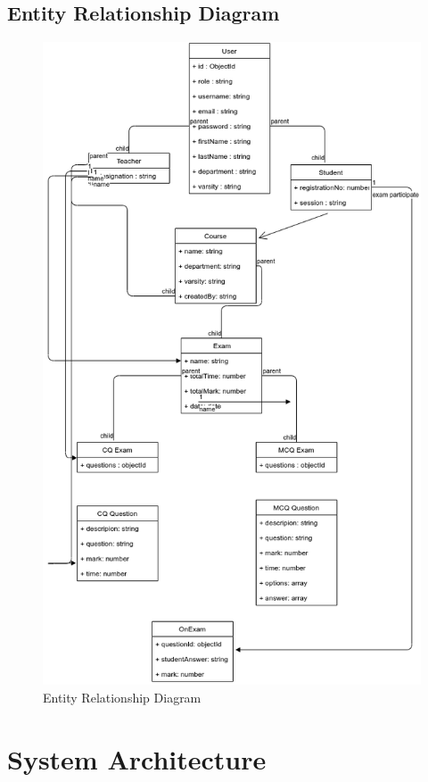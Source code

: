 \documentclass[10pt]{article}
\begin{document}
\subsection{Entity Relationship Diagram}

\begin{figure}[H]
  \centering
  \centerline{\includegraphics[width=\textwidth,height=0.8\textheight]{diagram/entity.png}}
  \caption{Entity Relationship Diagram}
  \label{fig}
\end{figure}

\section{System Architecture}
\end{document}
